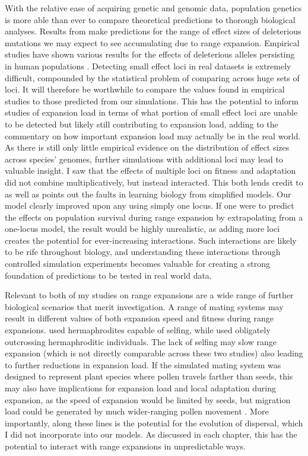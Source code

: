 With the relative ease of acquiring genetic and genomic data, population genetics is more able than ever to compare theoretical predictions to thorough biological analyses. Results from  make predictions for the range of effect sizes of deleterious mutations we may expect to see accumulating due to range expansion. Empirical studies have shown various results for the effects of deleterious alleles persisting in human populations \citep{Henn:2015, Lohmueller:2008, Do:2015}. Detecting small effect loci in real datasets is extremely difficult, compounded by the statistical problem of comparing across huge sets of loci. It will therefore be worthwhile to compare the values found in empirical studies to those predicted from our simulations. This has the potential to inform studies of expansion load in terms of what portion of small effect loci are unable to be detected but likely still contributing to expansion load, adding to the commentary on how important expansion load may actually be in the real world. As there is still only little empirical evidence on the distribution of effect sizes across species' genomes, further simulations with additional loci may lead to valuable insight. I saw that the effects of multiple loci on fitness and adaptation did not combine multiplicatively, but instead interacted. This both lends credit to as well as points out the faults in learning biology from simplified models. Our model clearly improved upon any using simply one locus. If one were to predict the effects on population survival during range expansion by extrapolating from a one-locus model, the result would be highly unrealistic, as adding more loci creates the potential for ever-increasing interactions. Such interactions are likely to be rife throughout biology, and understanding these interactions through controlled simulation experiments becomes valuable for creating a strong foundation of predictions to be tested in real world data. 

Relevant to both of my studies on range expansions are a wide range of further biological scenarios that merit investigation. A range of mating systems may result in different values of both expansion speed and fitness during range expansions.  used hermaphrodites capable of selfing, while  used obligately outcrossing hermaphroditic individuals. The lack of selfing may slow range expansion (which is not directly comparable across these two studies) also leading to further reductions in expansion load. If the simulated mating system was designed to represent plant species where pollen travels farther than seeds, this may also have implications for expansion load and local adaptation during expansion, as the speed of expansion would be limited by seeds, but migration load could be generated by much wider-ranging pollen movement \citep{Lopez:2008}. More importantly, along these lines is the potential for the evolution of dispersal, which I did not incorporate into our models. As discussed in each chapter, this has the potential to interact with range expansions in unpredictable ways.

